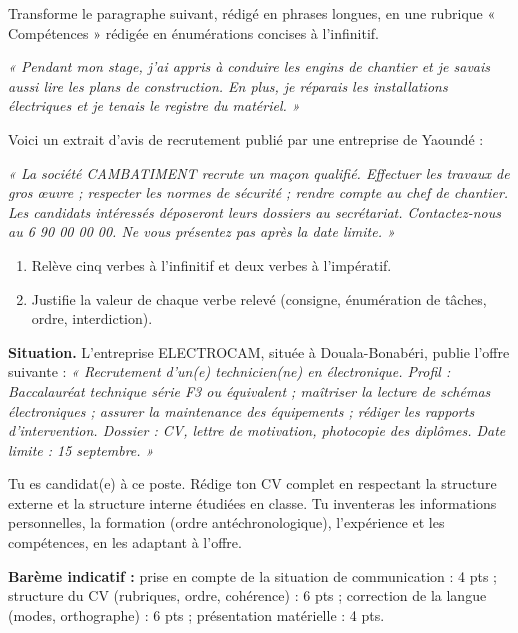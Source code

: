 \documentclass[11pt]{article}
\newcounter{popsec}
\newcounter{popsub}
\newcommand{\courssub}[1]{%
  \stepcounter{popsub}%
  \par\vspace{9pt}\noindent{\popxbold\fontsize{11.5}{13}\selectfont\color{popink}{\color{poporange}\thepopsec.\thepopsub}\hspace{6pt}#1}\par\nopagebreak\vspace{4pt}
}
\begin{document}
\begin{exercice}
Transforme le paragraphe suivant, rédigé en phrases longues, en une rubrique « Compétences » rédigée en énumérations concises à l'infinitif.

\emph{« Pendant mon stage, j'ai appris à conduire les engins de chantier et je savais aussi lire les plans de construction. En plus, je réparais les installations électriques et je tenais le registre du matériel. »}
\end{exercice}

\begin{exercice}
Voici un extrait d'avis de recrutement publié par une entreprise de Yaoundé :

\emph{« La société CAMBATIMENT recrute un maçon qualifié. Effectuer les travaux de gros œuvre ; respecter les normes de sécurité ; rendre compte au chef de chantier. Les candidats intéressés déposeront leurs dossiers au secrétariat. Contactez-nous au 6 90 00 00 00. Ne vous présentez pas après la date limite. »}

\begin{enumerate}
\item Relève cinq verbes à l'infinitif et deux verbes à l'impératif.
\item Justifie la valeur de chaque verbe relevé (consigne, énumération de tâches, ordre, interdiction).
\end{enumerate}
\end{exercice}

\courssub{Je me prépare au Bac}

\begin{exercice}
\textbf{Situation.} L'entreprise ELECTROCAM, située à Douala-Bonabéri, publie l'offre suivante : \emph{« Recrutement d'un(e) technicien(ne) en électronique. Profil : Baccalauréat technique série F3 ou équivalent ; maîtriser la lecture de schémas électroniques ; assurer la maintenance des équipements ; rédiger les rapports d'intervention. Dossier : CV, lettre de motivation, photocopie des diplômes. Date limite : 15 septembre. »}

Tu es candidat(e) à ce poste. Rédige ton CV complet en respectant la structure externe et la structure interne étudiées en classe. Tu inventeras les informations personnelles, la formation (ordre antéchronologique), l'expérience et les compétences, en les adaptant à l'offre.

\textbf{Barème indicatif :} prise en compte de la situation de communication : 4 pts ; structure du CV (rubriques, ordre, cohérence) : 6 pts ; correction de la langue (modes, orthographe) : 6 pts ; présentation matérielle : 4 pts.
\end{exercice}
\end{document}
